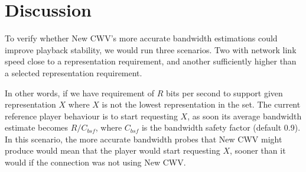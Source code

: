\documentclass[10pt,sigconf]{acmart}
\begin{document}



\section{Discussion}

To verify whether New CWV's more accurate bandwidth estimations could improve playback stability, we would run three scenarios. Two with network link speed close to a representation requirement, and another sufficiently higher than a selected representation requirement.

In other words, if we have requirement of $R$ bits per second to support given representation $X$ where $X$ is not the lowest representation in the set. The current reference player behaviour is to start requesting $X$, as soon its average bandwidth estimate becomes $R/C_{bsf}$, where $C_{bsf}$ is the bandwidth safety factor (default 0.9). In this scenario, the more accurate bandwidth probes that New CWV might produce would mean that the player would start requesting $X$, sooner than it would if the connection was not using New CWV.
\end{document}
